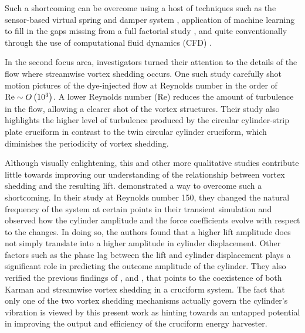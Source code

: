 \documentclass[oneside]{utmthesis}
\begin{document}
Such a shortcoming can be overcome using a host of techniques such as the sensor-based virtual spring and damper system \citep{Garcia2018,Sun2018}, application of machine learning to fill in the gaps missing from a full factorial study \citep{Wu2018,Ren2019,Raissi2019,Hu2020}, and quite conventionally through the use of computational fluid dynamics (CFD) \citep{Wu2011c,Zhang2018a}.

In the second focus area, investigators turned their attention to the details of the flow where streamwise vortex shedding occurs. One such study carefully shot motion pictures of the dye-injected flow \citep{Koide2017} at Reynolds number in the order of $\text{Re} \sim O\left( 10^{3} \right)$. A lower Reynolds number (Re) reduces the amount of turbulence in the flow, allowing a clearer shot of the vortex structures. Their study also highlights the higher level of turbulence produced by the circular cylinder-strip plate cruciform in contrast to the twin circular cylinder cruciform, which diminishes the periodicity of vortex shedding.

Although visually enlightening, this and other more qualitative studies contribute little towards improving our understanding of the relationship between vortex shedding and the resulting lift. \citet{Deng2007} demonstrated a way to overcome such a shortcoming. In their study at Reynolds number 150, they changed the natural frequency of the system at certain points in their transient simulation and observed how the cylinder amplitude and the force coefficients evolve with respect to the changes. In doing so, the authors found that a higher lift amplitude does not simply translate into a higher amplitude in cylinder displacement. Other factors such as the phase lag between the lift and cylinder displacement plays a significant role in predicting the outcome amplitude of the cylinder. They also verified the previous findings of \citet{Shirakashi1989}, \citet{Koide2009} and \citet{Koide2017}, that points to the coexistence of both Karman and streamwise vortex shedding in a cruciform system. The fact that only one of the two vortex shedding mechanisms actually govern the cylinder's vibration is viewed by this present work as hinting towards an untapped potential in improving the output and efficiency of the cruciform energy harvester.
\end{document}
